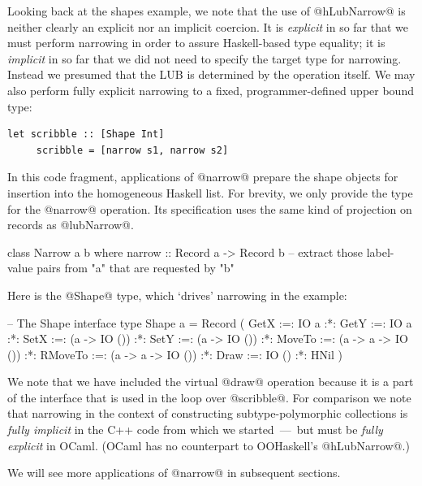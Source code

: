 \documentclass{jfp}
\begin{document}
Looking back at the shapes example, we note that the use of
@hLubNarrow@ is neither clearly an explicit nor an implicit coercion.
It is \emph{explicit} in so far that we must perform narrowing in
order to assure Haskell-based type equality; it is \emph{implicit} in
so far that we did not need to specify the target type for
narrowing. Instead we presumed that the LUB is determined by the
operation itself. We may also perform fully explicit narrowing to a
fixed, programmer-defined upper bound type:

\begin{Verbatim}[fontsize=\small,commandchars=\\\{\}]
 let scribble :: [Shape Int]
     scribble = [narrow s1, narrow s2]
\end{Verbatim}

In this code fragment, applications of @narrow@ prepare the shape
objects for insertion into the homogeneous Haskell list. For brevity,
we only provide the type for the @narrow@ operation. Its specification
uses the same kind of projection on records as @lubNarrow@.

\begin{code}
 class  Narrow a b
 where  narrow :: Record a -> Record b
 -- extract those label-value pairs from "a" that are requested by "b"
\end{code}

Here is the @Shape@ type, which `drives' narrowing in the example:

\begin{code}
 -- The Shape interface
 type Shape a = Record (  GetX    :=: IO a
                      :*: GetY    :=: IO a
                      :*: SetX    :=: (a -> IO ())
                      :*: SetY    :=: (a -> IO ())
                      :*: MoveTo  :=: (a -> a -> IO ())
                      :*: RMoveTo :=: (a -> a -> IO ())
                      :*: Draw    :=: IO ()
                      :*: HNil )
\end{code}

We note that we have included the virtual @draw@ operation because it
is a part of the interface that is used in the loop over
@scribble@. For comparison we note that narrowing in the context of
constructing subtype-polymorphic collections is \emph{fully implicit}
in the C++ code from which we started~---~but must be \emph{fully
explicit} in OCaml. (OCaml has no counterpart to OOHaskell's
@hLubNarrow@.)

We will see more applications of @narrow@ in subsequent sections.
\end{document}
